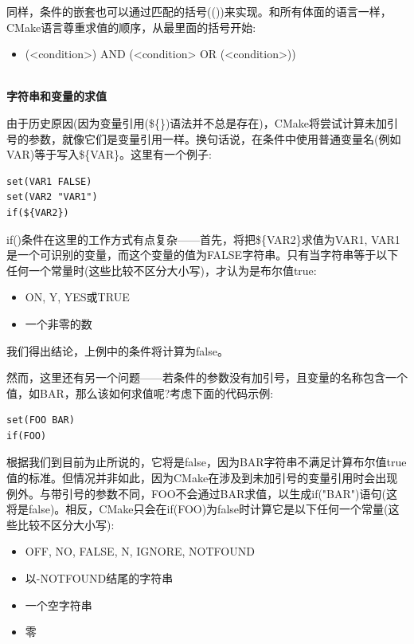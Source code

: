 同样，条件的嵌套也可以通过匹配的括号(())来实现。和所有体面的语言一样，CMake语言尊重求值的顺序，从最里面的括号开始:

\begin{itemize}
\item 
(<condition>) AND (<condition> OR (<condition>))
\end{itemize}

\hspace*{\fill} \\ %
\noindent
\textbf{字符串和变量的求值}

由于历史原因(因为变量引用(\$\{\})语法并不总是存在)，CMake将尝试计算未加引号的参数，就像它们是变量引用一样。换句话说，在条件中使用普通变量名(例如VAR)等于写入\$\{VAR\}。这里有一个例子:

\begin{lstlisting}[style=styleCMake]
set(VAR1 FALSE)
set(VAR2 "VAR1")
if(${VAR2})
\end{lstlisting}

if()条件在这里的工作方式有点复杂——首先，将把\$\{VAR2\}求值为VAR1, VAR1是一个可识别的变量，而这个变量的值为FALSE字符串。只有当字符串等于以下任何一个常量时(这些比较不区分大小写)，才认为是布尔值true:

\begin{itemize}
\item 
ON, Y, YES或TRUE

\item 
一个非零的数
\end{itemize}

我们得出结论，上例中的条件将计算为false。

然而，这里还有另一个问题——若条件的参数没有加引号，且变量的名称包含一个值，如BAR，那么该如何求值呢?考虑下面的代码示例:

\begin{lstlisting}[style=styleCMake]
set(FOO BAR)
if(FOO)
\end{lstlisting}

根据我们到目前为止所说的，它将是false，因为BAR字符串不满足计算布尔值true值的标准。但情况并非如此，因为CMake在涉及到未加引号的变量引用时会出现例外。与带引号的参数不同，FOO不会通过BAR求值，以生成if("BAR")语句(这将是false)。相反，CMake只会在if(FOO)为false时计算它是以下任何一个常量(这些比较不区分大小写):

\begin{itemize}
\item 
OFF, NO, FALSE, N, IGNORE, NOTFOUND

\item 
以-NOTFOUND结尾的字符串

\item 
一个空字符串

\item 
零
\end{itemize}

